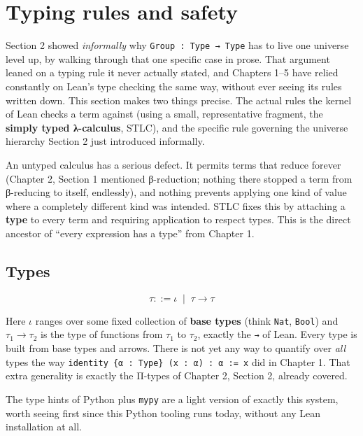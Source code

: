 \section{Typing rules and safety}\label{sec:06-rigor-check:03-typing-rules-and-safety:1}

Section 2 showed \emph{informally} why \texttt{Group : Type → Type} has to live one universe level up, by walking through that one specific case in prose. That argument leaned on a typing rule it never actually stated, and Chapters 1--5 have relied constantly on Lean's type checking the same way, without ever seeing its rules written down. This section makes two things precise. The actual rules the kernel of Lean checks a term against (using a small, representative fragment, the \textbf{simply typed λ-calculus}, STLC), and the specific rule governing the universe hierarchy Section 2 just introduced informally.

An untyped calculus has a serious defect. It permits terms that reduce forever (Chapter 2, Section 1 mentioned β-reduction; nothing there stopped a term from β-reducing to itself, endlessly), and nothing prevents applying one kind of value where a completely different kind was intended. STLC fixes this by attaching a \textbf{type} to every term and requiring application to respect types. This is the direct ancestor of ``every expression has a type'' from Chapter 1.

\subsection{Types}\label{sec:06-rigor-check:03-typing-rules-and-safety:2}

\[
\tau ::= \iota \;\mid\; \tau \to \tau
\]

Here \(\iota\) ranges over some fixed collection of \textbf{base types} (think \texttt{Nat}, \texttt{Bool}) and \(\tau_1 \to \tau_2\) is the type of functions from \(\tau_1\) to \(\tau_2\), exactly the \texttt{→} of Lean. Every type is built from base types and arrows. There is not yet any way to quantify over \emph{all} types the way \texttt{identity \{α : Type\} (x : α) : α := x} did in Chapter 1. That extra generality is exactly the Π-types of Chapter 2, Section 2, already covered.

\begin{progcorner}

The type hints of Python plus \texttt{mypy} are a light version of exactly this system, worth seeing first since this Python tooling runs today, without any Lean installation at all.

\end{progcorner}

